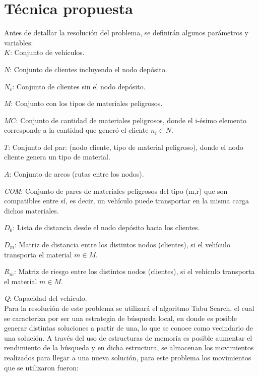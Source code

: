 \documentclass[conference]{IEEEtran}
\begin{document}
\section{T\'ecnica propuesta}

Antes de detallar la resoluci\'on del problema, se definir\'an algunos par\'ametros y variables:
\\

\textit{$K$}: Conjunto de veh\'iculos.

\textit{$N$}: Conjunto de clientes incluyendo el nodo dep\'osito.

\textit{$N_c$}: Conjunto de clientes sin el nodo dep\'osito.

\textit{$M$}: Conjunto con los tipos de materiales peligrosos.

\textit{$MC$}: Conjunto de cantidad de materiales peligrosos, donde el i-\'esimo elemento corresponde a la cantidad que gener\'o el cliente $n_i \in N$.

\textit{$T$}: Conjunto del par: (nodo cliente, tipo de material peligroso), donde el nodo cliente genera un tipo de material.

\textit{$A$}: Conjunto de arcos (rutas entre los nodos).

\textit{COM}: Conjunto de pares de materiales peligrosos del tipo (m,r) que son compatibles entre s\'i, es decir, un veh\'iculo puede transportar en la misma carga dichos materiales.

\textit{$D_0$}: Lista de distancia desde el nodo dep\'osito hacia los clientes.

\textit{$D_m$}: Matriz de distancia entre los distintos nodos (clientes), si el veh\'iculo transporta el material $m \in M$.

\textit{$R_m$}: Matriz de riesgo entre los distintos nodos (clientes), si el veh\'iculo transporta el material $m \in M$.

\textit{Q}: Capacidad del veh\'iculo.
\\



Para la resoluci\'on de este problema se utilizar\'a el algoritmo Tabu Search, el cual se caracteriza por ser una estrategia de b\'usqueda local, en donde es posible generar distintas soluciones a partir de una, lo que se conoce como vecindario de una soluci\'on. A través del uso de estructuras de memoria es posible aumentar el rendimiento de la b\'usqueda y en dicha estructura, se almacenan los movimientos realizados para llegar a una nueva soluci\'on, para este problema los movimientos que se utilizaron fueron: 
\end{document}
